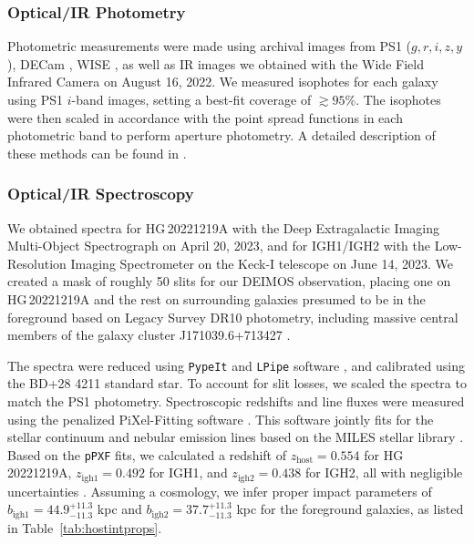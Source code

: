 \documentclass[twocolumn, linenumbers, tra]{aastex631}
\begin{document}
\subsubsection{Optical/IR Photometry}

Photometric measurements were made using archival images from PS1 ($g, r, i, z, y$), DECam \citep[$g, r, z$;][]{Valdes2014}, WISE \citep[$w1, w2$;][]{Wright2010}, as well as IR images we obtained with the Wide Field Infrared Camera \citep[WIRC, Ks;][]{Wilson2003} on August 16, 2022. We measured isophotes for each galaxy using PS1 $i$-band images, setting a best-fit coverage of $\gtrsim 95 \%$. The isophotes were then scaled in accordance with the point spread functions in each photometric band to perform aperture photometry. A detailed description of these methods can be found in \citet{Sharma2023}.

\subsubsection{Optical/IR Spectroscopy}

We obtained spectra for HG\,20221219A with the Deep Extragalactic Imaging Multi-Object Spectrograph \citep[Keck-II/DEIMOS;][]{Faber2003} on April 20, 2023, and for IGH1/IGH2 with the Low-Resolution Imaging Spectrometer on the Keck-I telescope \citep[Keck-I/LRIS;][]{Oke1995} on June 14, 2023. We created a mask of roughly 50 slits for our DEIMOS observation, placing one on HG\,20221219A and the rest on surrounding galaxies presumed to be in the foreground based on Legacy Survey DR10 photometry, including massive central members of the galaxy cluster J171039.6+713427 \citep{Wen2018}.

The spectra were reduced using \texttt{PypeIt} \citep{pypeit} and \texttt{LPipe} software \citep{Perley2019}, and calibrated using the BD+28 4211 standard star. To account for slit losses, we scaled the spectra to match the PS1 photometry. Spectroscopic redshifts and line fluxes were measured using the penalized PiXel-Fitting software \citep[\texttt{pPXF;}][]{Cappellari2017, Cappellari2022}. This software jointly fits for the stellar continuum and nebular emission lines based on the MILES stellar library \citep{SanchezBlazquez2006}. Based on the \texttt{pPXF} fits, we calculated a redshift of $z_{\mathrm{host}} = 0.554$ for HG\,20221219A, $z_{\mathrm{igh1}} = 0.492$ for IGH1, and $z_{\mathrm{igh2}} = 0.438$ for IGH2, all with negligible uncertainties \citep[$\lesssim 0.4\ \%$;][]{Sharma2023}. Assuming a \citet{Planck2018} cosmology, we infer proper impact parameters of $b_{\mathrm{igh1}} = 44.9_{-11.3}^{+11.3}$ kpc and $b_{\mathrm{igh2}} = 37.7_{-11.3}^{+11.3}$ kpc for the foreground galaxies, as listed in Table~\ref{tab:hostintprops}.
\end{document}
